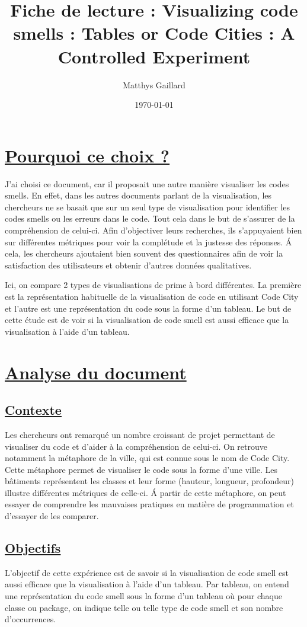\documentclass[a4paper,10pt, oneside]{article}
\title{Fiche de lecture : Visualizing code smells : Tables or Code Cities : A Controlled Experiment}
\author{Matthys Gaillard}
\date{\today}
\newcommand{\li}{\newline}
\begin{document}
\maketitle
\section{\ul{Pourquoi ce choix ?}}
        \par J'ai choisi ce document\cite{A1}, car il proposait une autre manière visualiser les codes smells. En effet, dans les autres documents parlant
        de la visualisation, les chercheurs ne se basait que sur un seul type de visualisation pour identifier les codes smells ou les erreurs dans le code. Tout cela dans le but de s'assurer 
        de la compréhension de celui-ci. Afin d'objectiver leurs recherches, ils s'appuyaient bien sur différentes métriques pour voir la complétude et la justesse des réponses. Á cela, les chercheurs ajoutaient bien souvent
        des questionnaires afin de voir la satisfaction des utilisateurs et obtenir d'autres données qualitatives. \li

        \par Ici, on compare 2 types de visualisations de prime à bord différentes. La première est la représentation habituelle de la visualisation de code en utilisant
        Code City et l'autre est une représentation du code sous la forme d'un tableau. Le but de cette étude est de voir si la visualisation de code smell est aussi efficace que la visualisation à l'aide d'un tableau.
\section{\ul{Analyse du document}}
\subsection{\ul{Contexte}}
        \par Les chercheurs ont remarqué un nombre croissant de projet permettant de visualiser du code et d'aider à la compréhension de celui-ci. On retrouve notamment la métaphore de la ville, qui est connue sous le nom de 
        Code City. Cette métaphore permet de visualiser le code sous la forme d'une ville. Les bâtiments représentent les classes et leur forme (hauteur, longueur, profondeur) illustre différentes métriques de celle-ci. Á 
        partir de cette métaphore, on peut essayer de comprendre les mauvaises pratiques en matière de programmation et d'essayer de les comparer. \li
\subsection{\ul{Objectifs}}
        \par L'objectif de cette expérience est de savoir si la visualisation de code smell est aussi efficace que la visualisation à l'aide d'un tableau. Par tableau, on entend une représentation du code smell sous la forme d'un tableau où pour chaque classe ou package,
        on indique telle ou telle type de code smell et son nombre d’occurrences.\li         
\end{document}
